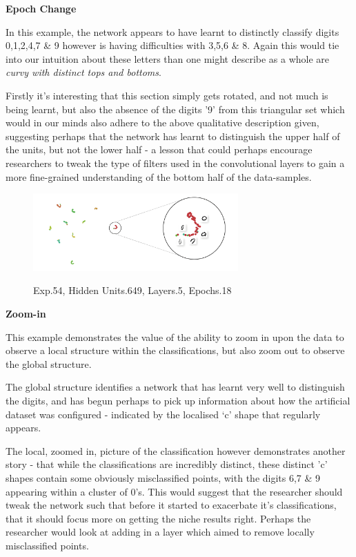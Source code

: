 \documentclass[a4paper,11pt,titlepage]{article}
\begin{document}
	\textbf{Epoch Change}
	\par 
	In this example, the network appears to have learnt to distinctly classify digits 0,1,2,4,7 \& 9 however is having difficulties with 3,5,6 \& 8. Again this would tie into our intuition about these letters than one might describe as a whole are \textit{curvy with distinct tops and bottoms}. 
	\par 
	Firstly it's interesting that this section simply gets rotated, and not much is being learnt, but also the absence of the digits '9' from this triangular set which would in our minds also adhere to the above qualitative description given, suggesting perhaps that the network has learnt to distinguish the upper half of the units, but not the lower half - a lesson that could perhaps encourage researchers to tweak the type of filters used in the convolutional layers to gain a more fine-grained understanding of the bottom half of the data-samples.

	\begin{figure}[H]
    			\centering	
			{{\includegraphics[width=0.7\textwidth]
    				{img/conc_X54_H649_L5_E18.png} 
    			}}%
    			\caption{Exp.54, Hidden Units.649, Layers.5, Epochs.18}%
    		\label{fig:mnistHinton}
	\end{figure}
	
	\textbf{Zoom-in}	
	\par 
	This example demonstrates the value of the ability to zoom in upon the data to observe a local structure within the classifications, but also zoom out to observe the global structure.
	\par 
	The global structure identifies a network that has learnt very well to distinguish the digits, and has begun perhaps to pick up information about how the artificial dataset was configured - indicated by the localised `c' shape that regularly appears. 
	\par 
	The local, zoomed in, picture of the classification however demonstrates another story - that while the classifications are incredibly distinct, these distinct 'c' shapes contain some obviously misclassified points, with the digits 6,7 \& 9 appearing within a cluster of 0's. This would suggest that the researcher should tweak the network such that before it started to exacerbate it's classifications, that it should focus more on getting the niche results right. Perhaps the researcher would look at adding in a layer which aimed to remove locally misclassified points.
	
\end{document}
